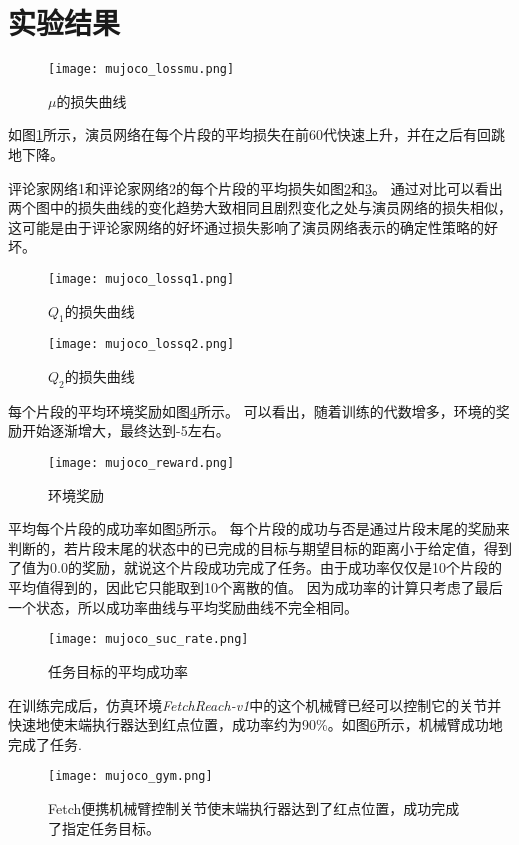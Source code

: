 \section{实验结果}

        \begin{figure}
        \centering
        \texttt{[image: mujoco\_lossmu.png]}
        \caption{$\mu$的损失曲线}
            \label{mujocolossmu}
        \end{figure}

        如图\ref{mujocolossmu}所示，演员网络在每个片段的平均损失在前60代快速上升，并在之后有回跳地下降。

        评论家网络1和评论家网络2的每个片段的平均损失如图\ref{mujocolossq1}和\ref{mujocolossq2}。
        通过对比可以看出两个图中的损失曲线的变化趋势大致相同且剧烈变化之处与演员网络的损失相似，这可能是由于评论家网络的好坏通过损失影响了演员网络表示的确定性策略的好坏。

        \begin{figure}
        \centering
        \texttt{[image: mujoco\_lossq1.png]}
        \caption{$Q_1$的损失曲线}
        \label{mujocolossq1} 
        \end{figure}

        \begin{figure}
        \centering
        \texttt{[image: mujoco\_lossq2.png]}
        \caption{$Q_2$的损失曲线}
        \label{mujocolossq2} 
        \end{figure}

        每个片段的平均环境奖励如图\ref{mujocoreward}所示。
        可以看出，随着训练的代数增多，环境的奖励开始逐渐增大，最终达到-5左右。
        \begin{figure}
        \centering
        \texttt{[image: mujoco\_reward.png]}
        \caption{环境奖励}
            \label{mujocoreward}
        \end{figure}

        平均每个片段的成功率如图\ref{mujocosuc}所示。
        每个片段的成功与否是通过片段末尾的奖励来判断的，若片段末尾的状态中的已完成的目标与期望目标的距离小于给定值，得到了值为0.0的奖励，就说这个片段成功完成了任务。由于成功率仅仅是10个片段的平均值得到的，因此它只能取到10个离散的值。
        因为成功率的计算只考虑了最后一个状态，所以成功率曲线与平均奖励曲线不完全相同。
        \begin{figure}
        \centering
        \texttt{[image: mujoco\_suc\_rate.png]}
        \caption{任务目标的平均成功率}
            \label{mujocosuc}
        \end{figure}

        在训练完成后，仿真环境\emph{FetchReach-v1}中的这个机械臂已经可以控制它的关节并快速地使末端执行器达到红点位置，成功率约为90\%。如图\ref{mujoco_gym}所示，机械臂成功地完成了任务.
        \begin{figure}
        \centering
        \texttt{[image: mujoco\_gym.png]}
            \caption{Fetch便携机械臂控制关节使末端执行器达到了红点位置，成功完成了指定任务目标。}
            \label{mujoco_gym}
        \end{figure}


